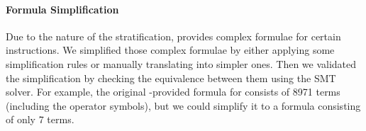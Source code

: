 



 
\vspace{-2pt}
\paragraph{Formula Simplification}

Due to the nature of the stratification, \Strata provides complex formulae for certain instructions.
%
We simplified those complex formulae by either applying some simplification rules or manually translating into simpler ones.
Then we validated the simplification by checking the equivalence between them using the SMT solver.
%
For example, the original \Strata-provided formula for     consists of 8971 terms (including the operator symbols), but we could simplify it to a formula consisting of only 7 terms.








